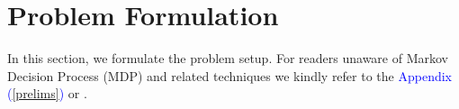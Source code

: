 \section{Problem Formulation}

In this section, we formulate the problem setup. For readers unaware of Markov Decision Process (MDP) and related techniques we kindly refer to the \textcolor{blue}{Appendix (\ref{prelims})} or \cite{sutton2018reinforcement}.





